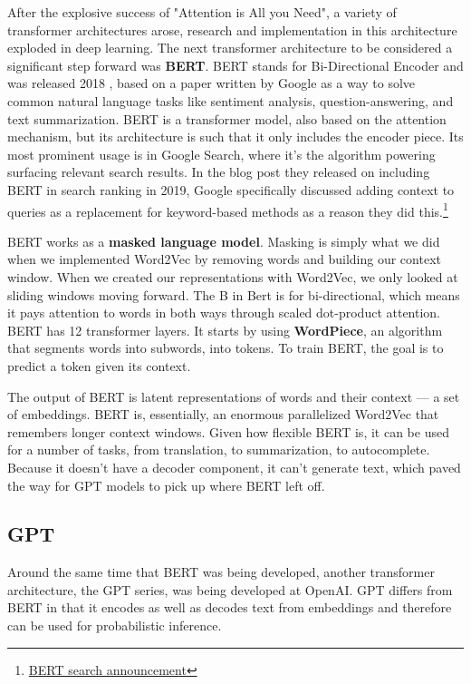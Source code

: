 \documentclass[11pt, table]{diazessay} %
\begin{document}
\begin{sloppypar}
After the explosive success of "Attention is All you Need", a variety of transformer architectures arose, research and implementation in this architecture exploded in deep learning. The next transformer architecture to be considered a significant step forward was \textbf{BERT}.
BERT stands for Bi-Directional Encoder and was released 2018 \citep{devlin2018bert}, based on a paper written by Google as a way to solve common natural language tasks like sentiment analysis, question-answering, and text summarization. BERT is a transformer model, also based on the attention mechanism, but its architecture is such that it only includes the encoder piece. Its most prominent usage is in Google Search, where it's the algorithm powering surfacing relevant search results. In the blog post they released on including BERT in search ranking in 2019, Google specifically discussed adding context to queries as a replacement for keyword-based methods as a reason they did this.\footnote{\href{https://blog.google/products/search/search-language-understanding-bert/}{BERT search announcement}}

BERT works as a \textbf{masked language model}. Masking is simply what we did when we implemented Word2Vec by removing words and building our context window. When we created our representations with Word2Vec, we only looked at sliding windows moving forward. The B in Bert is for bi-directional, which means it pays attention to words in both ways through scaled dot-product attention. BERT has 12 transformer layers. It starts by using \textbf{WordPiece}, an algorithm that segments words into subwords, into tokens. To train BERT, the goal is to predict a token given its context.

The output of BERT is latent representations of words and their context --- a set of embeddings. BERT is, essentially, an enormous parallelized Word2Vec that remembers longer context windows.  Given how flexible BERT is, it can be used for a number of tasks, from translation, to summarization, to autocomplete. Because it doesn't have a decoder component, it can't generate text, which paved the way for GPT models to pick up where BERT left off.


\subsection{GPT}
Around the same time that BERT was being developed, another transformer architecture, the GPT series, was being developed at OpenAI. GPT differs from BERT in that it encodes as well as decodes text from embeddings and therefore can be used for probabilistic inference.


\end{sloppypar}
\end{document}
